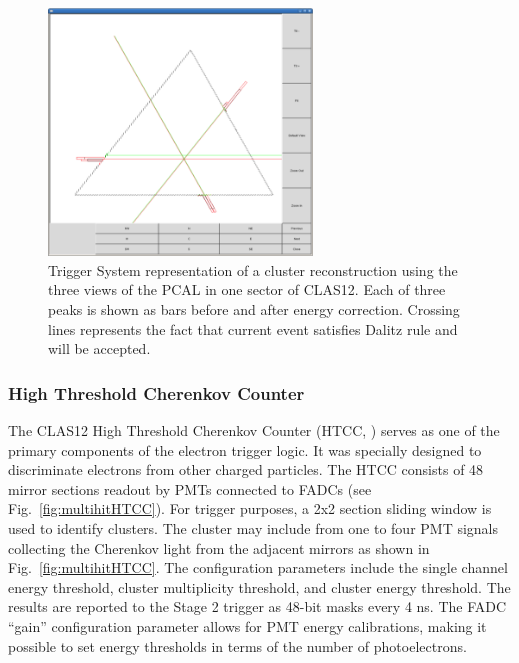 \begin{figure}[htp]
	\begin{center}
		\centering
		\includegraphics[width=7cm]{img/pcal1.png}
		\caption{Trigger System representation of a cluster reconstruction using the three views of the PCAL in one sector of CLAS12. Each of three peaks is shown as bars before and after energy correction. Crossing lines represents the fact that current event satisfies Dalitz rule and will be accepted.}
		\label{fig:PCAL}
	\end{center}
\end{figure} 


\subsubsection{High Threshold Cherenkov Counter}
\label{sec:HTCC}

The CLAS12 High Threshold Cherenkov Counter (HTCC, \cite{htcc-ref}) serves as one of the primary components of the electron trigger logic. It was specially designed to discriminate electrons from other charged particles. The HTCC consists of 48 mirror sections readout by PMTs connected to FADCs (see Fig.~\ref{fig:multihitHTCC}). For trigger purposes, a 2x2 section sliding window is used to identify clusters. The cluster may include from one to four PMT signals collecting the Cherenkov light from the adjacent mirrors as shown in  Fig.~\ref{fig:multihitHTCC}. The configuration parameters include the single channel energy threshold, cluster multiplicity threshold, and cluster energy threshold. The results are reported to the Stage 2 trigger as 48-bit masks every 4 ns. The FADC ``gain'' configuration parameter allows for PMT energy calibrations, making it possible to set energy thresholds in terms of the number of photoelectrons.


